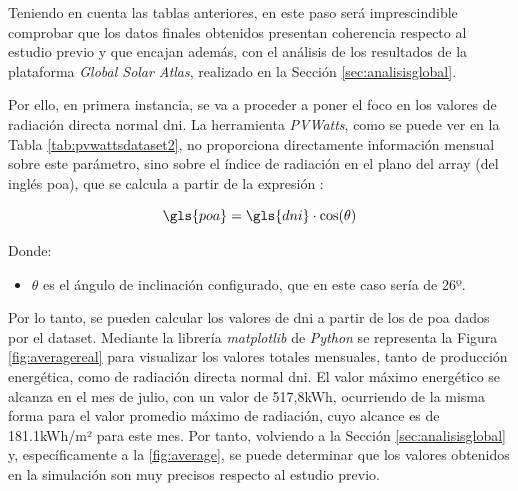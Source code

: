 \vspace{3mm}

Teniendo en cuenta las tablas anteriores, en este paso será imprescindible comprobar que los datos finales obtenidos presentan coherencia respecto al estudio previo y que encajan además, con el análisis de los resultados de la plataforma \textit{Global Solar Atlas}, realizado en la Sección \ref{sec:analisisglobal}. 

\vspace{3mm}

Por ello, en primera instancia, se va a proceder a poner el foco en los valores de radiación directa normal \gls{dni}. La herramienta \textit{PVWatts}, como se puede ver en la Tabla \ref{tab:pvwattsdataset2}, no proporciona directamente información mensual sobre este parámetro, sino sobre el índice de radiación en el plano del array (del inglés \gls{poa}), que se calcula a partir de la expresión \cite{poa}:

\[ \gls{poa} = \gls{dni} \cdot \cos(\theta) \]

    Donde:
\begin{itemize}
    \renewcommand{\labelitemi}{}
    \item \( \theta \) es el ángulo de inclinación configurado, que en este caso sería de 26º.
\end{itemize}

\vspace{3mm}

Por lo tanto, se pueden calcular los valores de \gls{dni} a partir de los de \gls{poa} dados por el dataset. Mediante la librería \textit{matplotlib} de \textit{Python} se representa la Figura \ref{fig:averagereal} para visualizar los valores totales mensuales, tanto de producción energética, como de radiación directa normal \gls{dni}. El valor máximo energético se alcanza en el mes de julio, con un valor de 517,8kWh, ocurriendo de la misma forma para el valor promedio máximo de radiación, cuyo alcance es de 181.1kWh/m² para este mes. Por tanto, volviendo a la Sección \ref{sec:analisisglobal} y, específicamente a la \ref{fig:average}, se puede determinar que los valores obtenidos en la simulación son muy precisos respecto al estudio previo.

\vspace{3mm}

